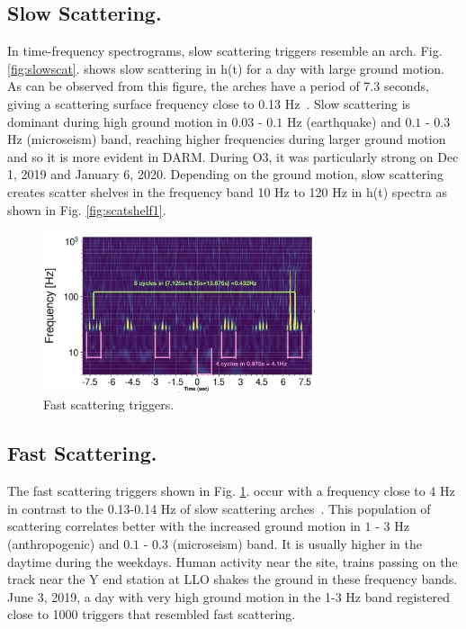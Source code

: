 \documentclass[12pt]{iopart}
\begin{document}
\subsection{Slow Scattering.}
In time-frequency spectrograms, slow scattering triggers resemble an arch.  Fig. \ref{fig:slowscat}. shows slow scattering in h(t) for a day with large ground motion.  As can be observed from this figure, the arches have a period of 7.3 seconds, giving a scattering surface frequency close to 0.13 Hz~\cite{alogsid}. 
Slow scattering is  dominant during high ground motion in $0.03$ - $0.1$ Hz (earthquake) and $0.1$ - $0.3$  Hz (microseism) band, reaching higher frequencies during larger ground motion and so it is more evident in DARM. During O3, it was particularly strong on Dec 1, 2019 and January 6, 2020.  Depending on the ground motion, slow scattering creates scatter shelves in the frequency band 10 Hz to 120 Hz in h(t) spectra as shown in Fig. \ref{fig:scatshelf1}.


\begin{figure}[h]
    \centering
    \includegraphics[width=8cm]{fastscat6.png}
    \caption{Fast scattering triggers.}
    \label{fig:fastscat}
\end{figure}


\subsection{Fast Scattering.}
The fast scattering triggers shown in Fig. \ref{fig:fastscat}. occur with a frequency close to 4 Hz in contrast to the 0.13-0.14 Hz of slow scattering arches~\cite{alogjosh}. This population of scattering correlates better with the increased ground motion in  $1$ - $3$ Hz (anthropogenic) and $0.1$ - $0.3$ (microseism) band. It is usually higher in the daytime during the weekdays. Human activity near the site, trains passing on the track near the Y end station at LLO shakes the ground in these frequency bands. June 3, 2019, a day with very high ground motion in the 1-3 Hz band registered close to 1000 triggers that resembled fast scattering. 
\end{document}
